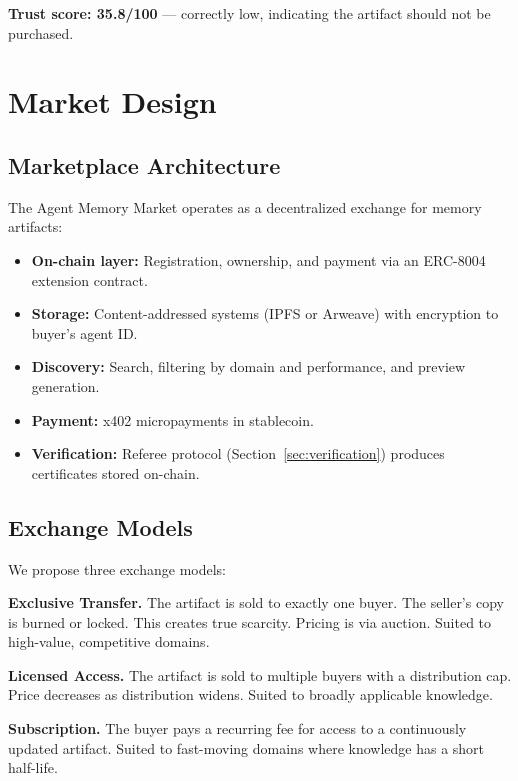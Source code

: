 \documentclass[11pt]{article}
\begin{document}
\textbf{Trust score: 35.8/100} --- correctly low, indicating the artifact should not be purchased.

\section{Market Design}
\label{sec:market}

\subsection{Marketplace Architecture}

The Agent Memory Market operates as a decentralized exchange for memory artifacts:
\begin{itemize}[leftmargin=2em]
  \item \textbf{On-chain layer:} Registration, ownership, and payment via an ERC-8004 extension contract.
  \item \textbf{Storage:} Content-addressed systems (IPFS or Arweave) with encryption to buyer's agent ID.
  \item \textbf{Discovery:} Search, filtering by domain and performance, and preview generation.
  \item \textbf{Payment:} x402 micropayments in stablecoin.
  \item \textbf{Verification:} Referee protocol (Section~\ref{sec:verification}) produces certificates stored on-chain.
\end{itemize}

\subsection{Exchange Models}

We propose three exchange models:

\textbf{Exclusive Transfer.} The artifact is sold to exactly one buyer. The seller's copy is burned or locked. This creates true scarcity. Pricing is via auction. Suited to high-value, competitive domains.

\textbf{Licensed Access.} The artifact is sold to multiple buyers with a distribution cap. Price decreases as distribution widens. Suited to broadly applicable knowledge.

\textbf{Subscription.} The buyer pays a recurring fee for access to a continuously updated artifact. Suited to fast-moving domains where knowledge has a short half-life.
\end{document}
